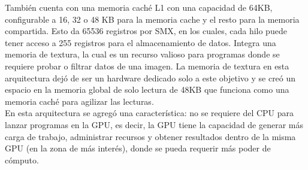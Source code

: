 También cuenta con una memoria caché L1 con una capacidad de 64KB, configurable a 16, 32 o 48 KB para la memoria cache y el resto para la memoria compartida. Esto da 65536 registros por SMX, en los cuales, cada hilo puede tener acceso a 255 registros para el almacenamiento de datos. Integra una memoria de textura, la cual es un recurso valioso para programas donde se requiere probar o filtrar datos de una imagen. La memoria de textura en esta arquitectura dejó de ser un hardware dedicado solo a este objetivo y se creó un espacio en la memoria global de solo lectura de 48KB que funciona como una memoria caché para agilizar las lecturas.\\
En esta arquitectura se agregó una característica: no se requiere del CPU para lanzar programas en la GPU, es decir, la GPU tiene la capacidad de generar más carga de trabajo, administrar recursos y obtener resultados dentro de la misma GPU (en la zona de más interés), donde se pueda requerir más poder de cómputo.
